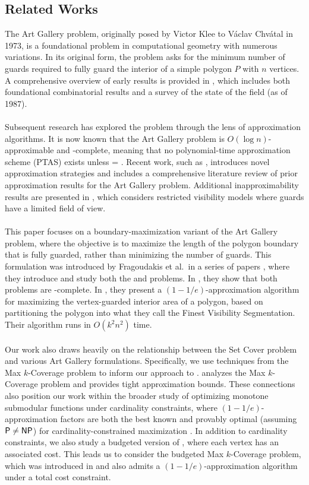 \subsection{Related Works}
The Art Gallery problem, originally posed by Victor Klee to Václav Chvátal in 1973, is a foundational problem in computational geometry with numerous variations. In its original form, the problem asks for the minimum number of guards required to fully guard the interior of a simple polygon $P$ with $n$ vertices. A comprehensive overview of early results is provided in \cite{orourke-artgallery}, which includes both foundational combinatorial results and a survey of the state of the field (as of 1987).\\\\
Subsequent research has explored the problem through the lens of approximation algorithms. It is now known that the Art Gallery problem is $O(\log n)$-approximable and -complete, meaning that no polynomial-time approximation scheme (PTAS) exists unless  = . Recent work, such as \cite{das-robustly}, introduces novel approximation strategies and includes a comprehensive literature review of prior approximation results for the Art Gallery problem. Additional inapproximability results are presented in \cite{abdelkader}, which considers restricted visibility models where guards have a limited field of view.\\\\
This paper focuses on a boundary-maximization variant of the Art Gallery problem, where the objective is to maximize the length of the polygon boundary that is fully guarded, rather than minimizing the number of guards. This formulation was introduced by Fragoudakis et al.\ in a series of papers \cite{fragoudakis-interior, fragoudakis-boundary, fragoudakis-paintings}, where they introduce and study both the \MLVG{} and \MVVG{} problems. In \cite{fragoudakis-boundary}, they show that both problems are -complete. In \cite{fragoudakis-interior}, they present a $(1-1/e)$-approximation algorithm for maximizing the vertex-guarded interior area of a polygon, based on partitioning the polygon into what they call the Finest Visibility Segmentation. Their algorithm runs in $O(k^2n^2)$ time.\\\\
Our work also draws heavily on the relationship between the Set Cover problem and various Art Gallery formulations. Specifically, we use techniques from the Max $k$-Coverage problem to inform our approach to \MLVG{}. \cite{hochbaum-maxkcover} analyzes the Max $k$-Coverage problem and provides tight approximation bounds. These connections also position our work within the broader study of optimizing monotone submodular functions under cardinality constraints, where $(1-1/e)$-approximation factors are both the best known and provably optimal (assuming $\textnormal{\textsf{P}}\neq\textnormal{\textsf{NP}}$) for cardinality-constrained maximization \cite{cornuejols,feige}.
In addition to cardinality constraints, we also study a budgeted version of \MVVG{}, where each vertex has an associated cost. This leads us to consider the budgeted Max $k$-Coverage problem, which was introduced in \cite{khuller} and also admits a $(1-1/e)$-approximation algorithm under a total cost constraint.

